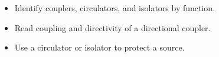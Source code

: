 \begin{objectives}
\begin{itemize}[leftmargin=1.4em,itemsep=2pt]
\item Identify couplers, circulators, and isolators by function.
\item Read coupling and directivity of a directional coupler.
\item Use a circulator or isolator to protect a source.
\end{itemize}
\end{objectives}
